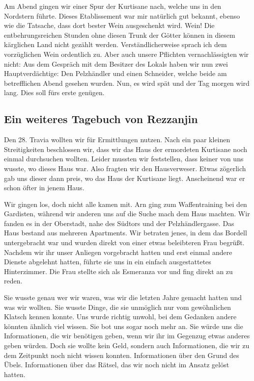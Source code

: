 Am Abend gingen wir einer Spur der Kurtisane nach, welche uns in den Nordstern führte. Dieses Etablissement war mir natürlich gut bekannt, ebenso wie die Tatsache, dass dort bester Wein ausgeschenkt wird. Wein! Die entbehrungsreichen Stunden ohne diesen Trunk der Götter können in diesem kärglichen Land nicht gezählt werden. Verständlicherweise sprach ich dem vorzüglichen Wein ordentlich zu. Aber auch unsere Pflichten vernachlässigten wir nicht: Aus dem Gespräch mit dem Besitzer des Lokals haben wir nun zwei Hauptverdächtige: Den Pelzhändler und einen Schneider, welche beide am betrefflichen Abend gesehen wurden. Nun, es wird spät und der Tag morgen wird lang. Dies soll fürs erste genügen. \par

\subsection{Ein weiteres Tagebuch von Rezzanjin}

Den 28. Travia wollten wir für Ermittlungen nutzen. Nach ein paar kleinen Streitigkeiten beschlossen wir, dass wir das Haus der ermordeten Kurtisane noch einmal durchsuchen wollten. Leider mussten wir feststellen, dass keiner von uns wusste, wo dieses Haus war. Also fragten wir den Hausverweser. Etwas zögerlich gab uns dieser dann preis, wo das Haus der Kurtisane liegt. Anscheinend war er schon öfter in jenem Haus. \par

Wir gingen los, doch nicht alle kamen mit. Arn ging zum Waffentraining bei den Gardisten, während wir anderen uns auf die Suche mach dem Haus machten. Wir fanden es in der Oberstadt, nahe des Südtors und der Pelzhändlergasse. Das Haus bestand aus mehreren Apartments. Wir betraten jenes, in dem das Bordell untergebracht war und wurden direkt von einer etwas beleibteren Frau begrüßt. Nachdem wir ihr unser Anliegen vorgebracht hatten und erst einmal andere Dienste abgelehnt hatten, führte sie uns in ein einfach ausgestattetes Hinterzimmer. Die Frau stellte sich als Esmeranza vor und fing direkt an zu reden. \par

Sie wusste genau wer wir waren, was wir die letzten Jahre gemacht hatten und was wir wollten. Sie wusste Dinge, die sie unmöglich nur vom gewöhnlichen Klatsch kennen konnte. Uns wurde richtig unwohl, bei dem Gedanken andere könnten ähnlich viel wissen. Sie bot uns sogar noch mehr an. Sie würde uns die Informationen, die wir benötigen geben, wenn wir ihr im Gegenzug etwas anderes geben würden. Doch sie wollte kein Geld, sondern auch Informationen, die wir zu dem Zeitpunkt noch nicht wissen konnten. Informationen über den Grund des Übels. Informationen über das Rätsel, das wir noch nicht im Ansatz gelöst hatten. \par

